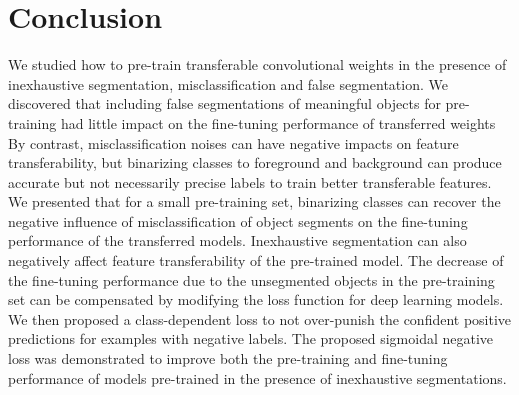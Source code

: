 \section{Conclusion}
\label{sec:conclusion}

We studied how to pre-train transferable convolutional weights in the presence of inexhaustive segmentation, misclassification and false segmentation.
We discovered that including false segmentations of meaningful objects for pre-training had little impact on the fine-tuning performance of transferred weights
By contrast, misclassification noises can have negative impacts on feature transferability, but binarizing classes to foreground and background can produce accurate but not necessarily precise labels to train better transferable features.
We presented that for a small pre-training set, binarizing classes can recover the negative influence of misclassification of object segments on the fine-tuning performance of the transferred models.
Inexhaustive segmentation can also negatively affect feature transferability of the pre-trained model.
The decrease of the fine-tuning performance due to the unsegmented objects in the pre-training set can be compensated by modifying the loss function for deep learning models.
We then proposed a class-dependent loss to not over-punish the confident positive predictions for examples with negative labels.
The proposed sigmoidal negative loss was demonstrated to improve both the pre-training and fine-tuning performance of models pre-trained in the presence of inexhaustive segmentations.
